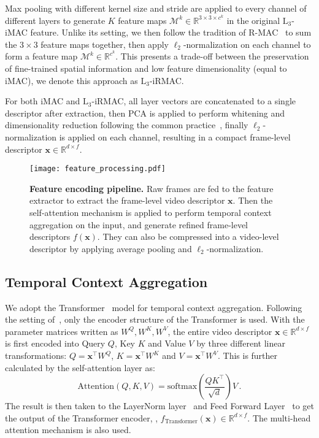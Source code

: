 \documentclass[10pt,twocolumn,letterpaper]{article}
\begin{document}
Max pooling with different kernel size and stride are applied to every channel of different layers to generate $K$ feature maps $\mathcal{M}^{k} \in \mathbb{R}^{3\times 3\times c^k}$ in the original $\text{L}_{3}$-iMAC feature. Unlike its setting, we then follow the tradition of R-MAC~\cite{tolias2015particular} to sum the $3\times3$ feature maps together, then apply $\ell_{2}$-normalization on each channel to form a feature map $\mathcal{M}^{k} \in \mathbb{R}^{c^k}$. This presents a trade-off between the preservation of fine-trained spatial information and low feature dimensionality (equal to iMAC), we denote this approach as $\text{L}_3$-iRMAC.

For both iMAC and $\text{L}_3$-iRMAC, all layer vectors are concatenated to a single descriptor after extraction, then PCA is applied to perform whitening and dimensionality reduction following the common practice~\cite{jegou2012negative,kordopatis2019visil}, finally $\ell_{2}$-normalization is applied on each channel, resulting in a compact frame-level descriptor $\mathbf{x} \in \mathbb{R}^{d \times f}$.

\begin{figure}[t]
    \centering
    \texttt{[image: feature\_processing.pdf]}
    \caption{\textbf{Feature encoding pipeline.} Raw frames are fed to the feature extractor to extract the frame-level video descriptor $\mathbf{x}$. Then the self-attention mechanism is applied to perform temporal context aggregation on the input, and generate refined frame-level descriptors  $f(\mathbf{x})$. They can also be compressed into a video-level descriptor by applying average pooling and $\ell_2$-normalization.}
\label{fig:feature}
\end{figure}

\subsection{Temporal Context Aggregation} \label{subsection:featagg}
We adopt the Transformer~\cite{vaswani2017attention} model for temporal context aggregation. Following the setting of~\cite{feng2018video,Xia2019WeaklySE}, only the encoder structure of the Transformer is used. With the parameter matrices written as $W^Q, W^K, W^V$, the entire video descriptor $\mathbf{x} \in \mathbb{R}^{d \times f}$ is first encoded into Query $Q$, Key $K$ and Value $V$ by three different linear transformations: $Q = \mathbf{x}^{\top}W^{Q}$, $K = \mathbf{x}^{\top}W^{K}$ and $V = \mathbf{x}^{\top}W^{V}$. This is further calculated by the self-attention layer as:
{\small
\begin{equation}
    \text{Attention}(Q,K,V) = \text{softmax}\left( \frac{QK^{\top}}{\sqrt{d}}\right)V \,.
\end{equation}
}
The result is then taken to the LayerNorm layer~\cite{ba2016layer} and Feed Forward Layer~\cite{vaswani2017attention} to get the output of the Transformer encoder, \ie, $f_{\text{Transformer}}(\mathbf{x}) \in \mathbb{R}^{d \times f}$. The multi-head attention mechanism is also used. 
\end{document}
